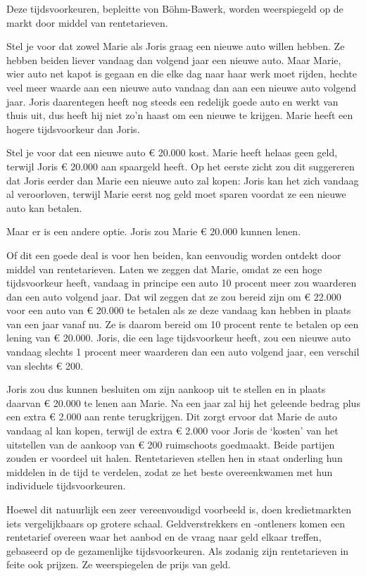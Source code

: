 \documentclass[smalldemyvopaper,11pt,twoside,onecolumn,openright,extrafontsizes,hidelinks]{memoir}
\begin{document}
Deze tijdsvoorkeuren, bepleitte von Böhm-Bawerk, worden weerspiegeld op
de markt door middel van rentetarieven.

Stel je voor dat zowel Marie als Joris graag een nieuwe auto willen
hebben. Ze hebben beiden liever vandaag dan volgend jaar een nieuwe
auto. Maar Marie, wier auto net kapot is gegaan en die elke dag naar
haar werk moet rijden, hechte veel meer waarde aan een nieuwe auto
vandaag dan aan een nieuwe auto volgend jaar. Joris daarentegen heeft
nog steeds een redelijk goede auto en werkt van thuis uit, dus heeft hij
niet zo'n haast om een nieuwe te krijgen. Marie heeft een hogere
tijdsvoorkeur dan Joris.

Stel je voor dat een nieuwe auto € 20.000 kost. Marie heeft helaas geen
geld, terwijl Joris € 20.000 aan spaargeld heeft. Op het eerste zicht
zou dit suggereren dat Joris eerder dan Marie een nieuwe auto zal kopen:
Joris kan het zich vandaag al veroorloven, terwijl Marie eerst nog geld
moet sparen voordat ze een nieuwe auto kan betalen.

Maar er is een andere optie. Joris zou Marie € 20.000 kunnen lenen.

Of dit een goede deal is voor hen beiden, kan eenvoudig worden ontdekt
door middel van rentetarieven. Laten we zeggen dat Marie, omdat ze een
hoge tijdsvoorkeur heeft, vandaag in principe een auto 10 procent meer
zou waarderen dan een auto volgend jaar. Dat wil zeggen dat ze zou
bereid zijn om € 22.000 voor een auto van € 20.000 te betalen als ze
deze vandaag kan hebben in plaats van een jaar vanaf nu. Ze is daarom
bereid om 10 procent rente te betalen op een lening van € 20.000. Joris,
die een lage tijdsvoorkeur heeft, zou een nieuwe auto vandaag slechts 1
procent meer waarderen dan een auto volgend jaar, een verschil van
slechts € 200.

Joris zou dus kunnen besluiten om zijn aankoop uit te stellen en in
plaats daarvan € 20.000 te lenen aan Marie. Na een jaar zal hij het
geleende bedrag plus een extra € 2.000 aan rente terugkrijgen. Dit zorgt
ervoor dat Marie de auto vandaag al kan kopen, terwijl de extra € 2.000
voor Joris de `kosten' van het uitstellen van de aankoop van € 200
ruimschoots goedmaakt. Beide partijen zouden er voordeel uit halen.
Rentetarieven stellen hen in staat onderling hun middelen in de tijd te
verdelen, zodat ze het beste overeenkwamen met hun individuele
tijdsvoorkeuren.

Hoewel dit natuurlijk een zeer vereenvoudigd voorbeeld is, doen
kredietmarkten iets vergelijkbaars op grotere schaal. Geldverstrekkers
en -ontleners komen een rentetarief overeen waar het aanbod en de vraag
naar geld elkaar treffen, gebaseerd op de gezamenlijke tijdsvoorkeuren.
Als zodanig zijn rentetarieven in feite ook prijzen. Ze weerspiegelen de
prijs van geld.
\end{document}
